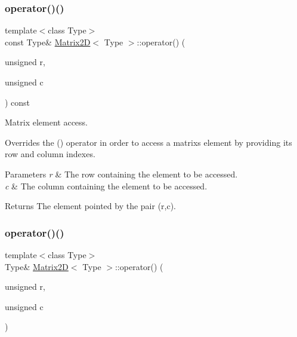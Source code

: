 \subsubsection{\texorpdfstring{operator()()}{operator()()}\hspace{0.1cm}{\footnotesize\ttfamily [1/4]}}
{\footnotesize\ttfamily template$<$class Type$>$ \\
const Type\& \hyperlink{classMatrix2D}{Matrix2D}$<$ Type $>$\+::operator() (\begin{DoxyParamCaption}\item[{unsigned}]{r,  }\item[{unsigned}]{c }\end{DoxyParamCaption}) const\hspace{0.3cm}{\ttfamily [inline]}}



Matrix element access. 

Overrides the {\ttfamily ()} operator in order to access a matrix\textquotesingle{}s element by providing its row and column indexes. 
\begin{DoxyParams}{Parameters}
{\em r} & The row containing the element to be accessed. \\
\hline
{\em c} & The column containing the element to be accessed. \\
\hline
\end{DoxyParams}
\begin{DoxyReturn}{Returns}
The element pointed by the pair (r,c). 
\end{DoxyReturn}
\mbox{\label{classMatrix2D_a448fd38c905dd2879244ac345c76b14e}} 
\subsubsection{\texorpdfstring{operator()()}{operator()()}\hspace{0.1cm}{\footnotesize\ttfamily [2/4]}}
{\footnotesize\ttfamily template$<$class Type$>$ \\
Type\& \hyperlink{classMatrix2D}{Matrix2D}$<$ Type $>$\+::operator() (\begin{DoxyParamCaption}\item[{unsigned}]{r,  }\item[{unsigned}]{c }\end{DoxyParamCaption})\hspace{0.3cm}{\ttfamily [inline]}}



